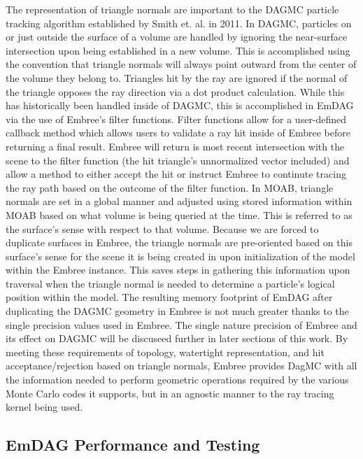 \documentclass[10pt, a4paper]{article}
\begin{document}
The representation of triangle normals are important to the DAGMC particle tracking algorithm established by Smith et. al. \cite{smith_thesis} in 2011. In DAGMC, particles on or just outside the surface of a volume are handled by ignoring the near-surface intersection upon being established in a new volume. This is accomplished using the convention that triangle normals will always point outward from the center of the volume they belong to. Triangles hit by the ray are ignored if the normal of the triangle opposes the ray direction via a dot product calculation. While this has historically been handled inside of DAGMC, this is accomplished in EmDAG via the use of Embree's filter functions. Filter functions allow for a user-defined callback method which allows users to validate a ray hit inside of Embree before returning a final result. Embree will return is most recent intersection with the scene to the filter function (the hit triangle's unnormalized vector included) and allow a method to either accept the hit or instruct Embree to continute tracing the ray path based on the outcome of the filter function. In MOAB, triangle normals are set in a global manner and adjusted using stored information within MOAB based on what volume is being queried at the time. This is referred to as the surface's sense with respect to that volume. Because we are forced to duplicate surfaces in Embree, the triangle normals are pre-oriented based on this surface's sense for the scene it is being created in upon initialization of the model within the Embree instance. This saves steps in gathering this information upon traversal when the triangle normal is needed to determine a particle's logical position within the model. The resulting memory footprint of EmDAG after duplicating the DAGMC geometry in Embree is not much greater thanks to the single precision values used in Embree. The single nature precision of Embree and its effect on DAGMC will be discuseed further in later sections of this work.
By meeting these requirements of topology, watertight representation, and hit acceptance/rejection based on triangle normals, Embree provides DagMC with all the information needed to perform geometric operations required by the various Monte Carlo codes it supports, but in an agnostic manner to the ray tracing kernel being used.

\subsection{EmDAG Performance and Testing}%
\end{document}
